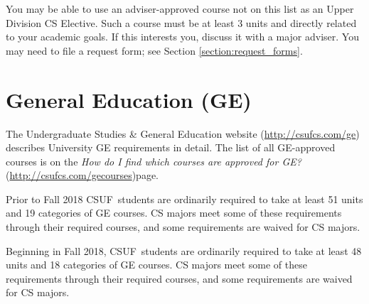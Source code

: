 \documentclass{book}
\newcommand{\CampusName}{CSUF}
\newcommand{\shrunkurl}[1]{\url{http://csufcs.com/#1}}
\begin{document}
You may be able to use an adviser-approved course not on this list as
an Upper Division CS Elective. Such a course must be at least 3 units
and directly related to your academic goals. If this interests you,
discuss it with a major adviser. You may need to file a request
form; see Section \ref{section:request_forms}.

\section{General Education (GE)}

\newcommand{\gecourselist}{\emph{How do I find which courses are approved for GE?} (\shrunkurl{gecourses})}

The Undergraduate Studies \& General Education website
(\shrunkurl{ge}) describes University GE
requirements in detail. The list of all GE-approved courses is on the
\gecourselist page.

Prior to Fall 2018 \CampusName~students are ordinarily required to
take at least 51 units and 19 categories of GE courses. CS majors meet
some of these requirements through their required courses, and some
requirements are waived for CS majors.

Beginning in Fall 2018, \CampusName~students are ordinarily required
to take at least 48 units and 18 categories of GE courses. CS majors
meet some of these requirements through their required courses, and
some requirements are waived for CS majors.
\end{document}
